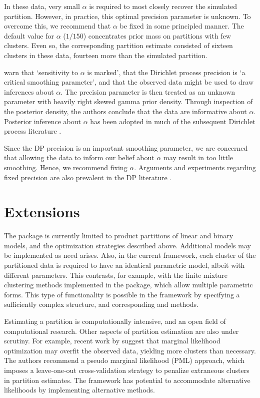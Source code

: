 \documentclass[article, nojss]{jss}
\begin{document}
In these data, very small $\alpha$ is required to most closely recover the simulated partition. However, in practice, this optimal precision parameter is unknown. To overcome this, we recommend that $\alpha$ be fixed in some principled manner. The default value for $\alpha$ ($1/150$) concentrates prior mass on partitions with few clusters. Even so, the corresponding partition estimate consisted of sixteen clusters in these data, fourteen more than the simulated partition.

\citet{EscobarWest1995} warn that `sensitivity to $\alpha$ is marked', that the Dirichlet process precision is `a critical smoothing parameter', and that the observed data might be used to draw inferences about $\alpha$. The precision parameter is then treated as an unknown parameter with heavily right skewed gamma prior density. Through inspection of the posterior density, the authors conclude that the data are informative about $\alpha$. Posterior inference about $\alpha$ has been adopted in much of the subsequent Dirichlet process literature \citep{BleiJordan2006,DunsonXueCarin2008,RodriguezDunsonGelfand2009,WangDunson2010}.

Since the DP precision is an important smoothing parameter, we are concerned that allowing the data to inform our belief about $\alpha$ may result in too little smoothing. Hence, we recommend fixing $\alpha$. Arguments and experiments regarding fixed precision are also prevalent in the DP literature \citep{BushMacEachern1996, Daume2007, DunsonPark2008}. 

\section[Extensions]{Extensions} \label{Extensions}
The  package is currently limited to product partitions of linear and binary models, and the optimization strategies described above. Additional models may be implemented as need arises. Also, in the current framework, each cluster of the partitioned data is required to have an identical parametric model, albeit with different parameters. This contrasts, for example, with the finite mixture clustering methods implemented in the  package, which allow multiple parametric forms. This type of functionality is possible in the  framework by specifying a sufficiently complex  structure, and corresponding  and  methods. 

Estimating a partition is computationally intensive, and an open field of computational research. Other aspects of partition estimation are also under scrutiny. For example, recent work by \citet{WangDunson2010} suggest that marginal likelihood optimization may overfit the observed data, yielding more clusters than necessary. The authors recommend a pseudo marginal likelihood (PML) approach, which imposes a leave-one-out cross-validation strategy to penalize extraneous clusters in partition estimates. The  framework has potential to accommodate alternative likelihoods by implementing alternative  methods.
\end{document}
